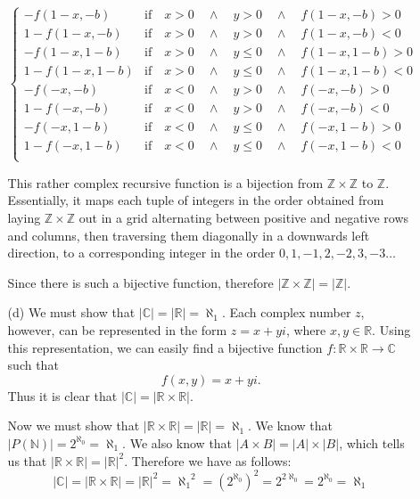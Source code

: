 \documentclass[fleqn]{article}
\begin{document}
\begin{enumerate}
\begin{enumerate}
\[\begin{cases}
			-f(1 - x, -b)		& \text{if} \quad x > 0 \quad \land \quad y > 0 \quad \land \quad f(1 - x, -b) > 0 \\
			1 - f(1 - x, -b)	& \text{if} \quad x > 0 \quad \land \quad y > 0 \quad \land \quad f(1 - x, -b) < 0 \\
			-f(1 - x, 1 - b)	& \text{if} \quad x > 0 \quad \land \quad y \leq 0 \quad \land \quad f(1 - x, 1 - b) > 0 \\
			1 - f(1 - x, 1 - b)	& \text{if} \quad x > 0 \quad \land \quad y \leq 0 \quad \land \quad f(1 - x, 1 - b) < 0 \\

			-f(-x, -b)			& \text{if} \quad x < 0 \quad \land \quad y > 0 \quad \land \quad f(-x, -b) > 0 \\
			1 - f(-x, -b)		& \text{if} \quad x < 0 \quad \land \quad y > 0 \quad \land \quad f(-x, -b) < 0 \\
			-f(-x, 1 - b)		& \text{if} \quad x < 0 \quad \land \quad y \leq 0 \quad \land \quad f(-x, 1 - b) > 0 \\
			1 - f(-x, 1 - b)	& \text{if} \quad x < 0 \quad \land \quad y \leq 0 \quad \land \quad f(-x, 1 - b) < 0 \\
		\end{cases}\]

		This rather complex recursive function is a bijection from \(\mathbb{Z} \times \mathbb{Z}\) to \(\mathbb{Z}\). Essentially, it maps each tuple of integers in the order obtained from laying \(\mathbb{Z} \times \mathbb{Z}\) out in a grid alternating between positive and negative rows and columns, then traversing them diagonally in a downwards left direction, to a corresponding integer in the order \(0, 1, -1, 2, -2, 3, -3 \dots\)

		Since there is such a bijective function, therefore \(|\mathbb{Z} \times \mathbb{Z}| = |\mathbb{Z}|\).

		\item[(d)]
		We must show that \(|\mathbb{C}| = |\mathbb{R}| = \aleph_1\). Each complex number \(z\), however, can be represented in the form \(z = x + yi\), where \(x, y \in \mathbb{R}\). Using this representation, we can easily find a bijective function \(f : \mathbb{R} \times \mathbb{R} \to \mathbb{C}\) such that
		\[f(x, y) = x + yi.\]
		Thus it is clear that \(|\mathbb{C}| = |\mathbb{R} \times \mathbb{R}|\).

		Now we must show that \(|\mathbb{R} \times \mathbb{R}| = |\mathbb{R}| = \aleph_1\). We know that \(|P(\mathbb{N})| = 2^{\aleph_0} = \aleph_1\). We also know that \(|A \times B| = |A| \times |B|\), which tells us that \(|\mathbb{R} \times \mathbb{R}| = |\mathbb{R}|^2\). Therefore we have as follows:
		\[|\mathbb{C}| = |\mathbb{R} \times \mathbb{R}| = |\mathbb{R}|^2 = {\aleph_1}^2 = {\left(2^{\aleph_0}\right)}^2 = 2^{2 \aleph_0} = 2^{\aleph_0} = \aleph_1\]
	\end{enumerate}


\end{enumerate}
\end{document}
